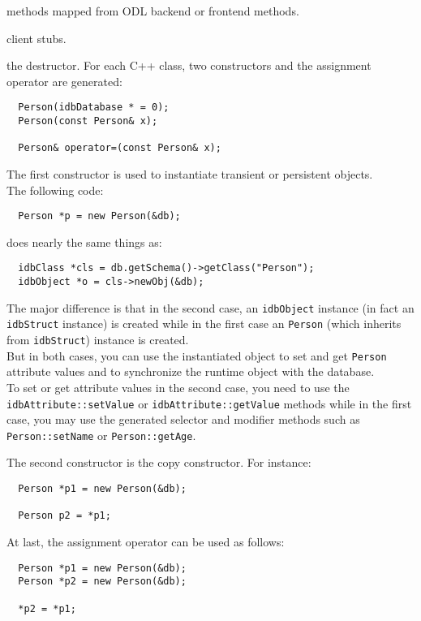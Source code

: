 \item methods mapped from ODL backend or frontend methods.
\item client stubs.
\item the destructor.
\ee
\ee
{}
For each C++ class, two constructors and the assignment operator are
generated:
\verbsize
\begin{verbatim}
  Person(idbDatabase * = 0);
  Person(const Person& x);

  Person& operator=(const Person& x);
\end{verbatim}
\normalsize
\bi
\item The first constructor is used to instantiate transient or persistent objects.
\\
The following code:
\verbsize
\begin{verbatim}
  Person *p = new Person(&db);
\end{verbatim}
\normalsize
does nearly the same things as:
\verbsize
\begin{verbatim}
  idbClass *cls = db.getSchema()->getClass("Person");
  idbObject *o = cls->newObj(&db);
\end{verbatim}
\normalsize
The major difference is that in the second case, an \texttt{idbObject} instance
(in fact an \texttt{idbStruct} instance) is created while in the first case
an \texttt{Person} (which inherits from \texttt{idbStruct}) instance is created.
\\
But in both cases, you can use the instantiated object to set and get
\texttt{Person} attribute values and to synchronize the runtime object with
the database.
\\
To set or get attribute values in the second case, you need to use
the \texttt{idbAttribute::setValue} or \texttt{idbAttribute::getValue} methods
while in the first case, you may use the generated selector and modifier
methods such as \texttt{Person::setName} or \texttt{Person::getAge}.
\item The second constructor is the copy constructor. For instance:
\verbsize
\begin{verbatim}
  Person *p1 = new Person(&db);

  Person p2 = *p1;
\end{verbatim}
\normalsize
\item At last, the assignment operator can be used as follows:
\verbsize
\begin{verbatim}
  Person *p1 = new Person(&db);
  Person *p2 = new Person(&db);

  *p2 = *p1;
\end{verbatim}
\normalsize
\ei

